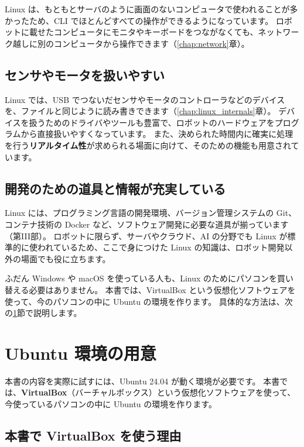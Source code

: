 Linux は、もともとサーバのように画面のないコンピュータで使われることが多かったため、CLI でほとんどすべての操作ができるようになっています。
ロボットに載せたコンピュータにモニタやキーボードをつながなくても、ネットワーク越しに別のコンピュータから操作できます（\ref{chap:network}章）。

\subsection{センサやモータを扱いやすい}

Linux では、USB でつないだセンサやモータのコントローラなどのデバイスを、ファイルと同じように読み書きできます（\ref{chap:linux_internals}章）。
デバイスを扱うためのドライバやツールも豊富で、ロボットのハードウェアをプログラムから直接扱いやすくなっています。
また、決められた時間内に確実に処理を行う\textbf{リアルタイム性}が求められる場面に向けて、そのための機能も用意されています。

\subsection{開発のための道具と情報が充実している}

Linux には、プログラミング言語の開発環境、バージョン管理システムの Git、コンテナ技術の Docker など、ソフトウェア開発に必要な道具が揃っています（第III部）。
ロボットに限らず、サーバやクラウド、AI の分野でも Linux が標準的に使われているため、ここで身につけた Linux の知識は、ロボット開発以外の場面でも役に立ちます。

\begin{point}
  ふだん Windows や macOS を使っている人も、Linux のためにパソコンを買い替える必要はありません。
  本書では、VirtualBox という仮想化ソフトウェアを使って、今のパソコンの中に Ubuntu の環境を作ります。
  具体的な方法は、次の\ref{sec:linux-setup}節で説明します。
\end{point}

\section{Ubuntu 環境の用意}
\label{sec:linux-setup}

本書の内容を実際に試すには、Ubuntu 24.04 が動く環境が必要です。
本書では、\textbf{VirtualBox}（バーチャルボックス）という仮想化ソフトウェアを使って、今使っているパソコンの中に Ubuntu の環境を作ります。

\subsection{本書で VirtualBox を使う理由}

